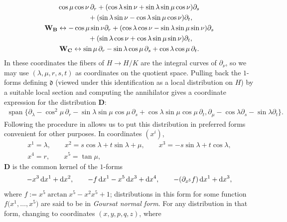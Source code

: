 \documentclass[pdftex]{sigma}
\newcommand{\mbA}{\mathbf{A}}
\newcommand{\mbB}{\mathbf{B}}
\newcommand{\mbC}{\mathbf{C}}
\newcommand{\mbD}{\mathbf{D}}
\newcommand{\mbW}{\mathbf{W}}
\newcommand{\mfd} {\mathfrak{d}}
\numberwithin{equation}{section}
\begin{document}
\begin{Example}
\begin{gather*}
		\cos \mu \cos \nu \, \partial_r
			+ (\cos \lambda \sin \nu + \sin \lambda \sin \mu \cos \nu) \partial_s \\
\hphantom{\mbW_{\mbA}\leftrightarrow}{} + (\sin \lambda \sin \nu - \cos \lambda \sin \mu \cos \nu) \partial_t , \\
	\mbW_{\mbB}\leftrightarrow
		-\cos \mu \sin \nu \partial_r
			+ (\cos \lambda \cos \nu - \sin \lambda \sin \mu \sin \nu) \partial_s \\
\hphantom{\mbW_{\mbB}\leftrightarrow}{} + (\sin \lambda \cos \nu + \cos \lambda \sin \mu \sin \nu) \partial_t , \\
	\mbW_{\mbC}\leftrightarrow
		\sin \mu \,\partial_r
			- \sin \lambda \cos \mu \,\partial_s
			+ \cos \lambda \cos \mu \,\partial_t .
\end{gather*}
In these coordinates the fibers of $H \to H / K$ are the integral curves of $\partial_{\nu}$, so we may use $(\lambda, \mu, r, s, t)$ as coordinates on the quotient space. Pulling back the $1$-forms defining $\mfd$ (viewed under this identification as a local distribution on $H$) by a suitable local section and computing the annihilator gives a coordinate expression for the distribution $\mbD$:
\begin{gather*}
	\operatorname{span}\big\{
		\partial_{\lambda}
			- \cos^2 \mu \, \partial_r
			- \sin \lambda \sin \mu \cos \mu \, \partial_s
			+ \cos \lambda \sin \mu \cos \mu \, \partial_t ,
		\partial_{\mu}
			- \cos \lambda \partial_s
			- \sin \lambda \partial_t
	\big\} .
\end{gather*}
Following the procedure in \cite[Section~2]{Strazzullo} allows us to put this distribution in preferred forms convenient for other purposes. In coordinates $(x^i)$,
\begin{gather*}
	x^1 = \lambda, \qquad
	x^2 = s \cos \lambda + t \sin \lambda + \mu, \qquad
	x^3 = -s \sin \lambda + t \cos \lambda, \\
	x^4 = r, \qquad
	x^5 = \tan \mu ,
\end{gather*}
$\mbD$ is the common kernel of the $1$-forms
\begin{gather*}
	-x^3 \,{\rm d}x^1 + {\rm d}x^2, \qquad
	- f \,{\rm d}x^1 - x^5 \,{\rm d}x^3 + {\rm d}x^4, \qquad
	- (\partial_{x^5} f) \,{\rm d}x^1 + {\rm d}x^3 ,
\end{gather*}
where $f := x^5 \arctan x^5 - x^2 x^5 + 1$; distributions in this form for some function $f\big(x^1, \ldots, x^5\big)$ are said to be in \textit{Goursat normal form}. For any distribution in that form, changing to coordinates $(x, y, p, q, z)$, where

\end{Example}
\end{document}
